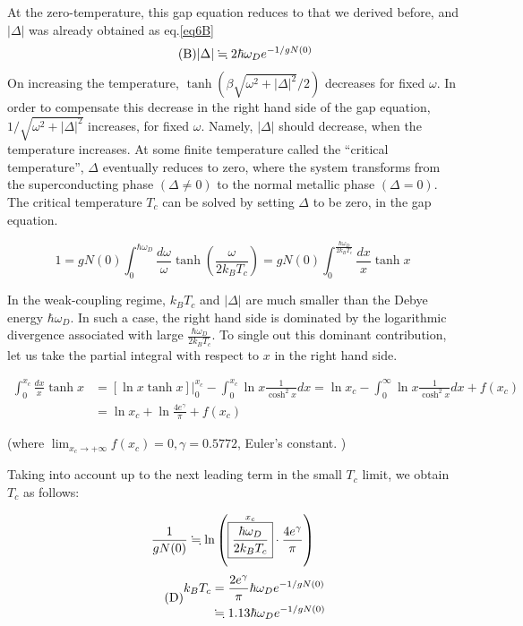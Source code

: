 At the zero-temperature, this gap equation reduces to that we derived before, and $|\Delta|$ was already obtained as eq.\eqref{eq6B}
\begin{align}\tag{B}
|\Delta| \fallingdotseq 2\hbar\omega_D e^{-1/gN(0)}
\end{align}
On increasing the temperature, $\tanh({\beta\sqrt{\omega^2+|\Delta|^2}}/{2})$ decreases for fixed $\omega$. In order to compensate this decrease in the right hand side of the gap equation, $1/\sqrt{\omega^2+|\Delta|^2}$ increases, for fixed $\omega$. Namely, $|\Delta|$ should decrease, when the temperature increases. At some finite temperature called the ``critical temperature'', $\Delta$ eventually reduces to zero, where the system transforms from the superconducting phase $(\Delta\neq0)$ to the normal metallic phase $(\Delta=0)$. The critical temperature $T_c$ can be solved by setting $\Delta$ to be zero, in the gap equation.

\[1 = gN(0)\int_0^{\hbar\omega_D}\frac{d\omega}{\omega}\tanh\left(\frac{\omega}{2k_BT_c}\right) = gN(0)\int_0^{\frac{\hbar\omega_D}{2k_BT_c}}\frac{dx}{x}\tanh x \]

In the weak-coupling regime, $k_BT_c$ and $|\Delta|$ are much smaller than the Debye energy $\hbar\omega_D$. In such a case, the right hand side is dominated by the logarithmic divergence associated with large $\displaystyle \frac{\hbar\omega_D}{2k_BT_c}$. To single out this dominant contribution, let us take the partial integral with respect to $x$ in the right hand side.

\[\begin{split}
\int_0^{x_c}\frac{dx}{x}\tanh x &= [\ln x\tanh x]\Big|_0^{x_c} - \int_0^{x_c}\ln x\frac{1}{\cosh^2 x}dx = \ln x_c - \int_0^{\infty}\ln x\frac{1}{\cosh^2 x}dx + f(x_c)\\
&=\ln x_c + \ln \frac{4e^\gamma}{\pi}+f(x_c)
\end{split}\]

(where $\displaystyle\lim_{x_c\to+\infty} f(x_c) = 0, \gamma = 0.5772$, Euler's constant. )

Taking into account up to the next leading term in the small $T_c$ limit, we obtain $T_c$ as follows:

\[\frac{1}{gN(0)}\fallingdotseq\ln\left(\overset{x_c}{\fbox{${\displaystyle\frac{\hbar\omega_D}{2k_BT_c}}$}}\cdot\frac{4e^\gamma}{\pi}\right) \]
\begin{align}\tag{D}\label{eq6D}
\begin{split}
k_BT_c &= \frac{2e^\gamma}{\pi}\hbar\omega_D e^{-1/gN(0)}\\
&\fallingdotseq 1.13\hbar\omega_D e^{-1/gN(0)}
\end{split}
\end{align}

